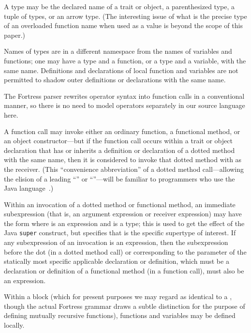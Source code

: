 A type may be the declared name of a trait or object, a parenthesized type, a
tuple of types, or an arrow type.  (The interesting issue of what is the
precise type of an overloaded function name when used as a value
is beyond the scope of this paper.)

Names of types are in a different namespace from the names
of variables and functions; one may have a type and a function, or a type and a variable,
with the same name.
Definitions and declarations of local function and variables are not permitted to shadow
outer definitions or declarations with the same name.

The Fortress parser rewrites operator syntax into function calls in a conventional manner,
so there is no need to model operators separately in our source language here.

A function call may invoke either an ordinary function, a functional method, or an object constructor---but
if the function call occurs within a trait
or object declaration that has or inherits a definition or declaration
of a dotted method with the same name, then it is considered to
invoke that dotted method with  as the receiver.
(This ``convenience abbreviation'' of a dotted method call---allowing the elision
of a leading ``'' or ``''---will
be familiar to programmers who use the Java language~\cite[\S 15.11]{JLS1}.)

Within an invocation of a dotted method or functional method,
an immediate subexpression (that is, an argument expression or receiver expression)
may have the form  where  is an expression and  is a type;
this is used to get the effect of the Java {\tt super} construct, but specifies
that  is the specific supertype of interest.  If any subexpression of an invocation
is an  expression, then the subexpression before the dot (in a dotted method call)
or corresponding to the  parameter of the statically most specific applicable declaration
or definition, which must be a declaration or definition of a functional method (in a function call),
must also be an  expression.

Within a block (which for present purposes we may regard as identical to
a , though the actual Fortress grammar draws a subtle distinction
for the purpose of defining mutually recursive functions),
functions and variables may be defined locally.

